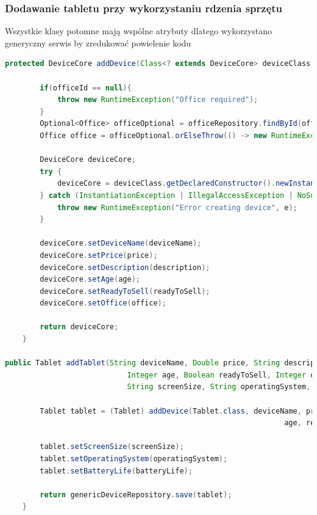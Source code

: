 \subsubsection{Dodawanie tabletu przy wykorzystaniu rdzenia sprzętu}
Wszystkie klasy potomne mają wspólne atrybuty dlatego wykorzystano generyczny serwis by zredukować powielenie kodu

\begin{lstlisting}[language=Java, style=JavaStyle,  caption={Dodawanie Tabletu z wykorzystaniem klasy nadrzędnej}, label={service_tablet}]
protected DeviceCore addDevice(Class<? extends DeviceCore> deviceClass, String deviceName, Double price, String description, Integer age, Boolean readyToSell, Integer officeId) {

        if(officeId == null){
            throw new RuntimeException("Office required");
        }
        Optional<Office> officeOptional = officeRepository.findById(officeId);
        Office office = officeOptional.orElseThrow(() -> new RuntimeException("Office not found with id: " + officeId));

        DeviceCore deviceCore;
        try {
            deviceCore = deviceClass.getDeclaredConstructor().newInstance();
        } catch (InstantiationException | IllegalAccessException | NoSuchMethodException | InvocationTargetException e) {
            throw new RuntimeException("Error creating device", e);
        }

        deviceCore.setDeviceName(deviceName);
        deviceCore.setPrice(price);
        deviceCore.setDescription(description);
        deviceCore.setAge(age);
        deviceCore.setReadyToSell(readyToSell);
        deviceCore.setOffice(office);

        return deviceCore;
    }

public Tablet addTablet(String deviceName, Double price, String description,
                            Integer age, Boolean readyToSell, Integer officeId,
                            String screenSize, String operatingSystem, String batteryLife){

        Tablet tablet = (Tablet) addDevice(Tablet.class, deviceName, price, description,
                                                                age, readyToSell, officeId);

        tablet.setScreenSize(screenSize);
        tablet.setOperatingSystem(operatingSystem);
        tablet.setBatteryLife(batteryLife);

        return genericDeviceRepository.save(tablet);
    }

\end{lstlisting}


